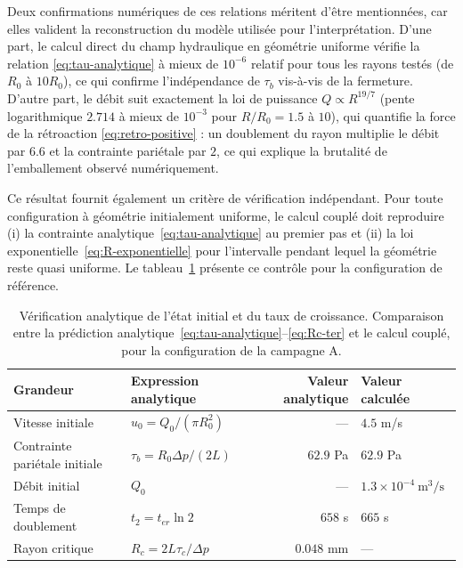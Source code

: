 \documentclass[11pt,a4paper]{report}
\newcommand{\ter}{{t_{er}}}
\begin{document}
Deux confirmations numériques de ces relations méritent d'être mentionnées, car elles valident la
reconstruction du modèle utilisée pour l'interprétation. D'une part, le calcul direct du champ hydraulique
en géométrie uniforme vérifie la relation \eqref{eq:tau-analytique} à mieux de \(10^{-6}\) relatif pour
tous les rayons testés (de \(R_0\) à \(10R_0\)), ce qui confirme l'indépendance de \(\tau_b\) vis-à-vis
de la fermeture. D'autre part, le débit suit exactement la loi de puissance
\(Q \propto R^{19/7}\) (pente logarithmique \(2.714\) à mieux de \(10^{-3}\) pour
\(R/R_0 = 1.5\) à \(10\)), qui quantifie la force de la rétroaction \eqref{eq:retro-positive} : un
doublement du rayon multiplie le débit par \(6.6\) et la contrainte pariétale par \(2\), ce qui explique
la brutalité de l'emballement observé numériquement.

Ce résultat fournit également un critère de vérification indépendant. Pour toute configuration à géométrie
initialement uniforme, le calcul couplé doit reproduire (i) la contrainte analytique~\eqref{eq:tau-analytique}
au premier pas et (ii) la loi exponentielle~\eqref{eq:R-exponentielle} pour l'intervalle pendant lequel la
géométrie reste quasi uniforme. Le tableau~\ref{tab:verif-analytique} présente ce contrôle pour la
configuration de référence.

\begin{table}[H]
\centering
\caption{Vérification analytique de l'état initial et du taux de croissance. Comparaison entre la
prédiction analytique~\eqref{eq:tau-analytique}--\eqref{eq:Rc-ter} et le calcul couplé, pour la
configuration de la campagne A.}
\label{tab:verif-analytique}
\small
\begin{tabular}{llrl}
\toprule
Grandeur & Expression analytique & Valeur analytique & Valeur calculée \\
\midrule
Vitesse initiale & \(u_0 = Q_0/(\pi R_0^2)\) & --- & \(4.5\) m/s \\
Contrainte pariétale initiale & \(\tau_b = R_0\Delta p/(2L)\) & \(62.9\) Pa & \(62.9\) Pa \\
Débit initial & \(Q_0\) & --- & \(1.3\times10^{-4}\ \mathrm{m^3/s}\) \\
Temps de doublement & \(t_2 = \ter\ln 2\) & \(658\) s & \(665\) s \\
Rayon critique & \(R_c = 2L\tau_c/\Delta p\) & \(0.048\) mm & --- \\
\bottomrule
\end{tabular}
\end{table}
\end{document}

